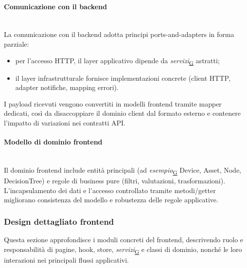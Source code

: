 \documentclass[a4paper,12pt]{article}
\begin{document}
            \paragraph{Comunicazione con il backend}\mbox{}\\
            La comunicazione con il backend adotta principi ports-and-adapters in forma parziale:
            \begin{itemize}
                \item per l'accesso HTTP, il layer applicativo dipende da \textit{servizi}\textsubscript{\href{https://atlasteam9.github.io/Atlas/glossario.html\#Servizi}{G}} astratti;
                \item il layer infrastrutturale fornisce implementazioni concrete (client HTTP, adapter notifiche, mapping errori).
            \end{itemize}
            I payload ricevuti vengono convertiti in modelli frontend tramite mapper dedicati, così da disaccoppiare il dominio client dal formato esterno e contenere l'impatto di variazioni nei contratti API.
            
            \paragraph{Modello di dominio frontend}\mbox{}\\
            Il dominio frontend include entità principali (ad \textit{esempio}\textsubscript{\href{https://atlasteam9.github.io/Atlas/glossario.html\#Esempio}{G}} Device, Asset, Node, DecisionTree) e regole di business pure (filtri, valutazioni, trasformazioni).  
            L'incapsulamento dei dati e l'accesso controllato tramite metodi/getter migliorano consistenza del modello e robustezza delle regole applicative.

            
        \subsubsection{Design dettagliato frontend}
            Questa sezione approfondisce i moduli concreti del frontend, descrivendo ruolo e responsabilità di pagine, hook, store, \textit{servizi}\textsubscript{\href{https://atlasteam9.github.io/Atlas/glossario.html\#Servizi}{G}} e classi di dominio, nonché le loro interazioni nei principali flussi applicativi.
\end{document}
